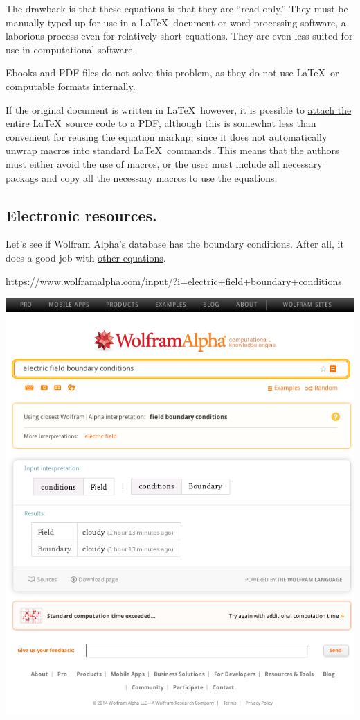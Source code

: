 \documentclass[12pt,letterpaper]{article}
\begin{document}
The drawback is that these equations is that they are ``read-only.''
They must be manually typed up for use in a \LaTeX\ document or word processing software,
a laborious process even for relatively short equations.
They are even less suited for use in computational software.

Ebooks and PDF files do not solve this problem,
as they do not use \LaTeX\ or computable formats internally.

If the original document is written in \LaTeX\, however,
it is possible to
\href{http://www.ctan.org/pkg/embedfile}
{attach the entire \LaTeX\ source code to a PDF},
although this is somewhat less than convenient for reusing the equation markup,
since it does not automatically unwrap macros into standard \LaTeX\ commands.
This means that the authors must either avoid the use of macros,
or the user must include all necessary packags and copy all the necessary macros to use the equations.

\subsection{Electronic resources.}

Let's see if Wolfram Alpha's database has the boundary conditions.
After all,
it does a good job with
\href{https://www.wolframalpha.com/input/?i=particle+in+a+magnetic+field}
{other equations}.

\url{https://www.wolframalpha.com/input/?i=electric+field+boundary+conditions}

\begin{center}
\includegraphics[scale=0.7]{wolfram-alpha-electric-field-boundary-conditions.png}
\end{center}
\end{document}

